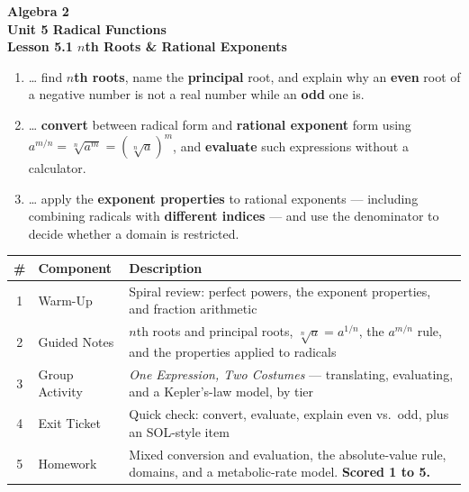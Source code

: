 \documentclass[10pt]{article}
\begin{document}
\vspace{-0.8in}

\begin{center}
  {\color{white}\textbf{\LARGE Algebra 2}}\\[4pt]
  {\color{forestmid}\large\textbf{Unit 5 \quad Radical Functions}}\\[6pt]
  {\color{white}\textbf{\large Lesson 5.1 \quad $n$th Roots \& Rational Exponents}}
\end{center}

\vspace{0.22in}
\namedateperiod
\vspace{0.18in}

\begin{learningtargetbox}
\small
\begin{enumerate}[leftmargin=1.5em, itemsep=5pt]
  \item \ldots{} find \textbf{$n$th roots}, name the \textbf{principal} root, and explain why an \textbf{even} root of a negative number is not a real number while an \textbf{odd} one is.
  \item \ldots{} \textbf{convert} between radical form and \textbf{rational exponent} form using $a^{m/n}=\sqrt[n]{a^m}=\left(\sqrt[n]{a}\right)^m$, and \textbf{evaluate} such expressions without a calculator.
  \item \ldots{} apply the \textbf{exponent properties} to rational exponents --- including combining radicals with \textbf{different indices} --- and use the denominator to decide whether a domain is restricted.
\end{enumerate}
\end{learningtargetbox}

\vspace{0.14in}

\begin{tocbox}
\small
\renewcommand{\arraystretch}{1.5}
\begin{tabularx}{\linewidth}{@{} c l X @{}}
\rowcolor{forestbg}
\textbf{\#} & \textbf{Component} & \textbf{Description} \\
\midrule
1 & Warm-Up        & Spiral review: perfect powers, the exponent properties, and fraction arithmetic \\
2 & Guided Notes   & $n$th roots and principal roots, $\sqrt[n]{a}=a^{1/n}$, the $a^{m/n}$ rule, and the properties applied to radicals \\
3 & Group Activity & \emph{One Expression, Two Costumes} --- translating, evaluating, and a Kepler's-law model, by tier \\
4 & Exit Ticket    & Quick check: convert, evaluate, explain even vs.\ odd, plus an SOL-style item \\
5 & Homework       & Mixed conversion and evaluation, the absolute-value rule, domains, and a metabolic-rate model. \textbf{Scored 1 to 5.} \\
\end{tabularx}
\end{tocbox}
\end{document}
